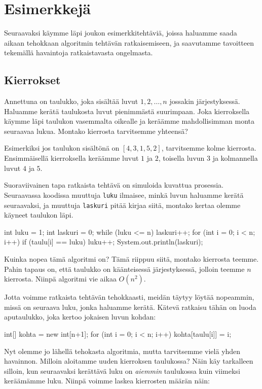 \section{Esimerkkejä}

Seuraavaksi käymme läpi joukon esimerkkitehtäviä,
joissa haluamme saada aikaan tehokkaan algoritmin tehtävän ratkaisemiseen,
ja saavutamme tavoitteen tekemällä havaintoja ratkaistavasta ongelmasta.

\subsection{Kierrokset}

Annettuna on taulukko, joka sisältää luvut $1,2,\dots,n$
jossakin järjestyksessä.
Haluamme kerätä taulukosta luvut pienimmästä suurimpaan.
Joka kierroksella käymme läpi taulukon vasemmalta
oikealle ja keräämme mahdollisimman monta seuraavaa lukua.
Montako kierrosta tarvitsemme yhteensä?

Esimerkiksi jos taulukon sisältönä on $[4,3,1,5,2]$,
tarvitsemme kolme kierrosta.
Ensimmäisellä kierroksella keräämme luvut $1$ ja $2$,
toisella luvun $3$ ja kolmannella luvut $4$ ja $5$.

Suoraviivainen tapa ratkaista tehtävä on simuloida
kuvattua prosessia.
Seuraavassa koodissa muuttuja \texttt{luku} ilmaisee,
minkä luvun haluamme kerätä seuraavaksi,
ja muuttuja \texttt{laskuri} pitää kirjaa siitä, montako kertaa
olemme käyneet taulukon läpi.

\begin{code}
int luku = 1;
int laskuri = 0;
while (luku <= n) {
    laskuri++;
    for (int i = 0; i < n; i++) {
        if (taulu[i] == luku) luku++;
    }
}
System.out.println(laskuri);
\end{code}

Kuinka nopea tämä algoritmi on?
Tämä riippuu siitä, montako kierrosta teemme.
Pahin tapaus on, että taulukko on käänteisessä järjestyksessä,
jolloin teemme $n$ kierrosta.
Niinpä algoritmi vie aikaa $O(n^2)$.

Jotta voimme ratkaista tehtävän tehokkaasti,
meidän täytyy löytää nopeammin, missä on seuraava luku,
jonka haluamme kerätä.
Kätevä ratkaisu tähän on luoda aputaulukko,
joka kertoo jokaisen luvun kohdan:

\begin{code}
int[] kohta = new int[n+1];
for (int i = 0; i < n; i++) {
    kohta[taulu[i]] = i;
}
\end{code}

Nyt olemme jo lähellä tehokasta algoritmia, mutta
tarvitsemme vielä yhden havainnon.
Milloin aloitamme uuden kierroksen taulukossa?
Näin käy tarkalleen silloin, kun seuraavaksi kerättävä
luku on \emph{aiemmin} taulukossa kuin viimeksi
keräämämme luku.
Niinpä voimme laskea kierrosten määrän näin:

